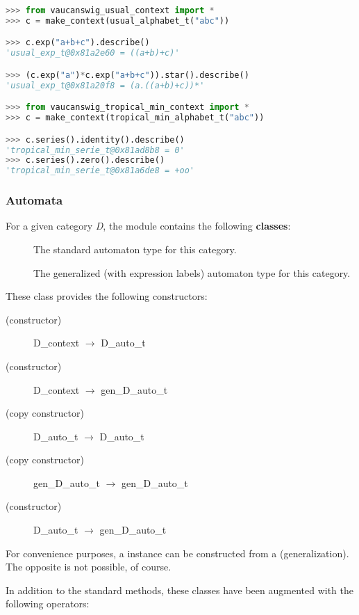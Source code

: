 \begin{lstlisting}[language=Python]
>>> from vaucanswig_usual_context import *
>>> c = make_context(usual_alphabet_t("abc"))

>>> c.exp("a+b+c").describe()
'usual_exp_t@0x81a2e60 = ((a+b)+c)'

>>> (c.exp("a")*c.exp("a+b+c")).star().describe()
'usual_exp_t@0x81a20f8 = (a.((a+b)+c))*'

>>> from vaucanswig_tropical_min_context import *
>>> c = make_context(tropical_min_alphabet_t("abc"))

>>> c.series().identity().describe()
'tropical_min_serie_t@0x81ad8b8 = 0'
>>> c.series().zero().describe()
'tropical_min_serie_t@0x81a6de8 = +oo'
\end{lstlisting}

\subsubsection{Automata}

For  a  given  category  \emph{D},  the  module  
contains the following \textbf{classes}:

\begin{description}
\item[] The standard automaton type for this
  category.
\item[] The generalized (with expression labels)
  automaton type for this category.
\end{description}

These class provides the following constructors:

\begin{description}
\item[(constructor)] D\_context $\to$ D\_auto\_t
\item[(constructor)] D\_context $\to$ gen\_D\_auto\_t
\item[(copy constructor)] D\_auto\_t $\to$ D\_auto\_t
\item[(copy constructor)] gen\_D\_auto\_t $\to$ gen\_D\_auto\_t
\item[(constructor)] D\_auto\_t $\to$ gen\_D\_auto\_t
\end{description}

For   convenience  purposes,  a     instance   can  be
constructed from a   (generalization). The opposite is not
possible, of course.

In addition to the standard \Vauc methods, these classes have been
augmented with the following operators:

